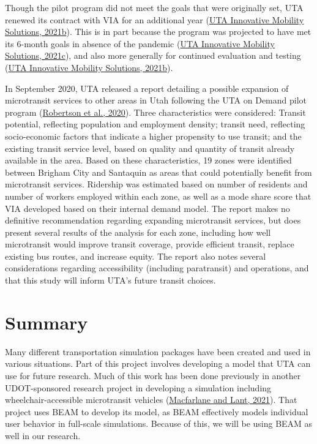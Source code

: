 \documentclass[
]{report}
\begin{document}
Though the pilot program did not meet the goals that were originally set, UTA renewed its contract with VIA for an additional year (\protect\hyperlink{ref-UTAevalQ3}{UTA Innovative Mobility Solutions, 2021b}). This is in part because the program was projected to have met its 6-month goals in absence of the pandemic (\protect\hyperlink{ref-UTAevalQ2}{UTA Innovative Mobility Solutions, 2021c}), and also more generally for continued evaluation and testing (\protect\hyperlink{ref-UTAevalQ3}{UTA Innovative Mobility Solutions, 2021b}).

In September 2020, UTA released a report detailing a possible expansion of microtransit services to other areas in Utah following the UTA on Demand pilot program (\protect\hyperlink{ref-UTAreport}{Robertson et al., 2020}). Three characteristics were considered: Transit potential, reflecting population and employment density; transit need, reflecting socio-economic factors that indicate a higher propensity to use transit; and the existing transit service level, based on quality and quantity of transit already available in the area. Based on these characteristics, 19 zones were identified between Brigham City and Santaquin as areas that could potentially benefit from microtransit services. Ridership was estimated based on number of residents and number of workers employed within each zone, as well as a mode share score that VIA developed based on their internal demand model. The report makes no definitive recommendation regarding expanding microtransit services, but does present several results of the analysis for each zone, including how well microtransit would improve transit coverage, provide efficient transit, replace existing bus routes, and increase equity. The report also notes several considerations regarding accessibility (including paratransit) and operations, and that this study will inform UTA's future transit choices.

\hypertarget{summary}{%
\section{Summary}\label{summary}}

Many different transportation simulation packages have been created and used in various situations. Part of this project involves developing a model that UTA can use for future research. Much of this work has been done previously in another UDOT-sponsored research project in developing a simulation including wheelchair-accessible microtransit vehicles (\protect\hyperlink{ref-MacfarlaneLant}{Macfarlane and Lant, 2021}). That project uses BEAM to develop its model, as BEAM effectively models individual user behavior in full-scale simulations. Because of this, we will be using BEAM as well in our research.
\end{document}
